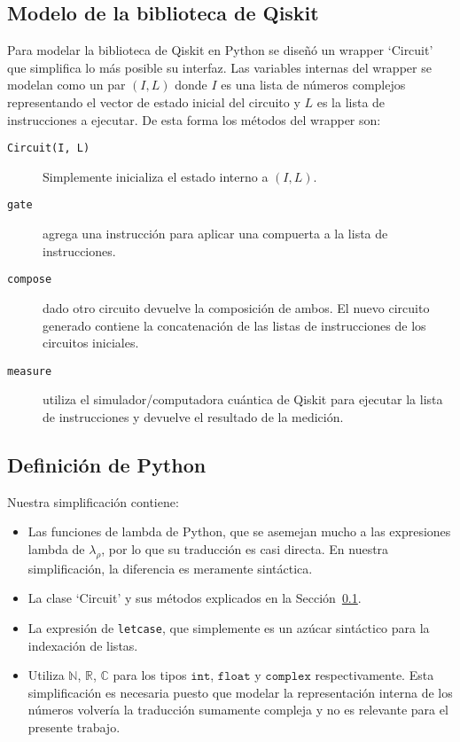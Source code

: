 \subsection{Modelo de la biblioteca de Qiskit}\label{sub:qiskit_model}
Para modelar la biblioteca de Qiskit en Python se diseñó un wrapper `Circuit' que simplifica lo más posible su interfaz. Las variables internas del wrapper se modelan como un par $(I, L)$ donde $I$ es una lista de números complejos representando el vector de estado inicial del circuito y $L$ es la lista de instrucciones a ejecutar. De esta forma los métodos del wrapper son:
\begin{description}
    \item[\texttt{Circuit(I, L)}] Simplemente inicializa el estado interno a $(I, L)$.
    \item[\texttt{gate}] agrega una instrucción para aplicar una compuerta a la lista de instrucciones.
    \item[\texttt{compose}] dado otro circuito devuelve la composición de ambos. El nuevo circuito generado contiene la concatenación de las listas de instrucciones de los circuitos iniciales.
    \item[\texttt{measure}] utiliza el simulador/computadora cuántica de Qiskit para ejecutar la lista de instrucciones y devuelve el resultado de la medición.
    
\end{description} 


\subsection{Definición de Python}

Nuestra simplificación contiene:
\begin{itemize}
    \item Las funciones de lambda de Python, que se asemejan mucho a las expresiones lambda de $\lambda_\rho$, por lo que su traducción es casi directa. En nuestra simplificación, la diferencia es meramente sintáctica.
    \item La clase `Circuit' y sus métodos explicados en la Sección~\ref{sub:qiskit_model}.
    \item La expresión de \texttt{letcase}, que simplemente es un azúcar sintáctico para la indexación de listas.
    \item Utiliza $\mathbb{N}$, $\mathbb{R}$, $\mathbb{C}$ para los tipos $\texttt{int}$, $\texttt{float}$ y  $\texttt{complex}$ respectivamente. Esta simplificación es necesaria puesto que modelar la representación interna de los números volvería la traducción sumamente compleja y no es relevante para el presente trabajo.
\end{itemize}

